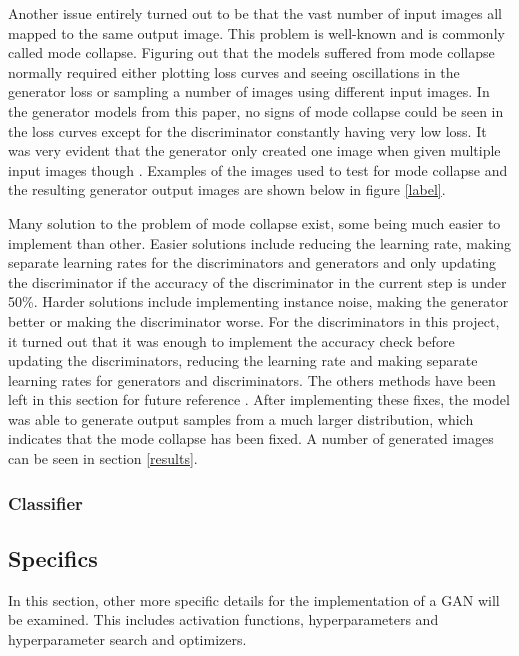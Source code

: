 \documentclass[12pt, fleqn, titlepage]{article}
\begin{document}
Another issue entirely turned out to be that the vast number of input images all mapped to the same output image. This problem is well-known and is commonly called mode collapse. Figuring out that the models suffered from mode collapse normally required either plotting loss curves and seeing oscillations in the generator loss or sampling a number of images using different input images. In the generator models from this paper, no signs of mode collapse could be seen in the loss curves except for the discriminator constantly having very low loss. It was very evident that the generator only created one image when given multiple input images though \cite{mode_collapse_MLM}. Examples of the images used to test for mode collapse and the resulting generator output images are shown below in figure \ref{label}.

%	
Many solution to the problem of mode collapse exist, some being much easier to implement than other. Easier solutions include reducing the learning rate, making separate learning rates for the discriminators and generators and only updating the discriminator if the accuracy of the discriminator in the current step is under 50\%. Harder solutions include implementing instance noise, making the generator better or making the discriminator worse. For the discriminators in this project, it turned out that it was enough to implement the accuracy check before updating the discriminators, reducing the learning rate and making separate learning rates for generators and discriminators. The others methods have been left in this section for future reference \cite{mode_collapse_reddit_fix}\cite{mode_collapse_github}. After implementing these fixes, the model was able to generate output samples from a much larger distribution, which indicates that the mode collapse has been fixed. A number of generated images can be seen in section \ref{results}.

\subsubsection{Classifier}


\subsection{Specifics}\label{model_specifics}
In this section, other more specific details for the implementation of a GAN will be examined. This includes activation functions, hyperparameters and hyperparameter search and optimizers.
\end{document}
